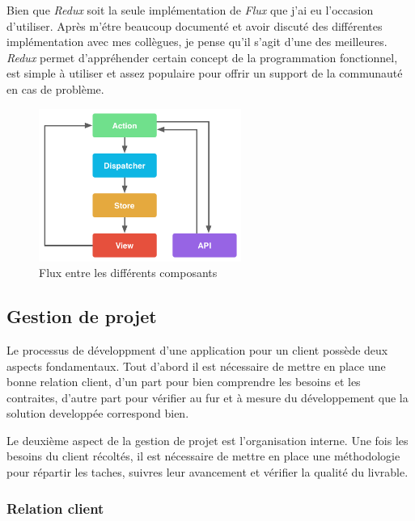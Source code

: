 \documentclass[12pt,a4paper]{article}
\begin{document}
  Bien que \emph{Redux} soit la seule implémentation de \emph{Flux} que
  j'ai eu l'occasion d'utiliser. Après m'étre beaucoup documenté et avoir
  discuté des différentes implémentation avec mes collègues, je pense
  qu'il s'agit d'une des meilleures. \emph{Redux} permet d'appréhender
  certain concept de la programmation fonctionnel, est simple à utiliser
  et assez populaire pour offrir un support de la communauté en cas de
  problème.

  \bigskip

  \begin{figure}[h]
    \centering
    \includegraphics[height=5cm]{figures/react.png}
    \caption{Flux entre les différents composants}
  \end{figure}

  \subsection{Gestion de projet}\label{gestion-de-projet}

  Le processus de développment d'une application pour un client possède
  deux aspects fondamentaux. Tout d'abord il est nécessaire de mettre en
  place une bonne relation client, d'un part pour bien comprendre les
  besoins et les contraites, d'autre part pour vérifier au fur et à mesure
  du développement que la solution developpée correspond bien.

  Le deuxième aspect de la gestion de projet est l'organisation interne.
  Une fois les besoins du client récoltés, il est nécessaire de mettre en
  place une méthodologie pour répartir les taches, suivres leur avancement
  et vérifier la qualité du livrable.

  \bigskip

  \subsubsection{Relation client}\label{relation-client}

  \bigskip
\end{document}
